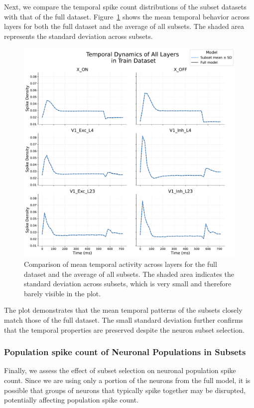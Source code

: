 Next, we compare the temporal spike count distributions of the subset datasets with that of the full dataset. Figure~\ref{fig:temporal_distribution_subset_vs_full_train} shows the mean temporal behavior across layers for both the full dataset and the average of all subsets. The shaded area represents the standard deviation across subsets.
\begin{figure}
    \centering
    \includegraphics[width=\linewidth]{img/plots/temporal_distribution_subset_vs_full_train.pdf}
    \caption{Comparison of mean temporal activity across layers for the full dataset and the average of all subsets. The shaded area indicates the standard deviation across subsets, which is very small and therefore barely visible in the plot.}
    \label{fig:temporal_distribution_subset_vs_full_train}
\end{figure}

The plot demonstrates that the mean temporal patterns of the subsets closely match those of the full dataset. The small standard deviation further confirms that the temporal properties are preserved despite the neuron subset selection.


\subsubsection{Population spike count of Neuronal Populations in Subsets}
\label{subsubsec:neuron_synchrony_subset}
Finally, we assess the effect of subset selection on neuronal population spike count. Since we are using only a portion of the neurons from the full model, it is possible that groups of neurons that typically spike together may be disrupted, potentially affecting population spike count.

